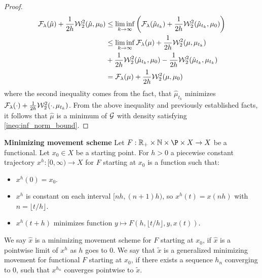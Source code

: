 \begin{proof}
\[
\begin{aligned}
\mathcal{F}_{\lambda}(\hat{\mu}) + \frac{1}{2h} {\cal W}_2^2(\hat{\mu}, \mu_0)  & \leq \liminf_{k \rightarrow \infty} \left( \mathcal{F}_{\lambda}(\hat{\mu}_{t_k}) + \frac{1}{2h} {\cal W}_2^2(\hat{\mu}_{t_k} , \mu_0) \right) \\
& \leq \liminf_{k \rightarrow \infty}  \mathcal{F}_{\lambda}(\mu) + \frac{1}{2h} {\cal W}_2^2(\mu , \mu_{t_k})   \\
& + \frac{1}{2h}  {\cal W}_2^2(\hat{\mu}_{t_k}, \mu_0) - \frac{1}{2h} {\cal W}_2^2(\hat{\mu}_{t_k}, \mu_{t_k})   \\
& = \mathcal{F}_{\lambda} (\mu) + \frac{1}{2h} {\cal W}_2^2(\mu, \mu_0) 
\end{aligned}
\]
where the second inequality comes from the fact, that $\hat{\mu}_{t_k}$ minimizes $\mathcal{F}_{\lambda}(\cdot) + \frac{1}{2h}{\cal W}_2^2(\cdot, \mu_{t_k})$. From the above inequality and previously established facts, it follows that $\hat{\mu}$ is a minimum of $\mathcal{G}$ with density satisfying \ref{ineq:inf_norm_bound}.
\end{proof}

\begin{definition} \textbf{Minimizing movement scheme}
Let $F : \mathbb{R_+} \times \mathbb{N} \times \P \times X \rightarrow X$ be a functional. Let $x_0 \in X$ be a starting point. For $h> 0$ a piecewise constant trajectory $x^h : [0, \infty) \rightarrow X$ for $F$ starting at $x_0$ is a function such that:
\begin{itemize}
\item $x^h(0) = x_0$.
\item $x^h$ is constant on each interval $[nh, (n+1)h)$, so $x^h(t) = x(nh)$ with $n = \lfloor t/h \rfloor$.
\item $x^h(t +h )$ minimizes function $ y \mapsto F(h, \lfloor t/h \rfloor, y ,x(t))$.
\end{itemize}
We say $\hat{x}$ is a minimizing movement scheme for $F$ starting at $x_0$, if $\hat{x}$ is a pointwise limit of $x^h$ as $h$ goes to $0$. We say that $\tilde{x}$ is a generalized minimizing movement for functional $F$ starting at $x_0$, if there exists a sequence $h_n$ converging to $0$, such that $x^{h_n}$ converges pointwise to $\tilde{x}$.
\end{definition}

